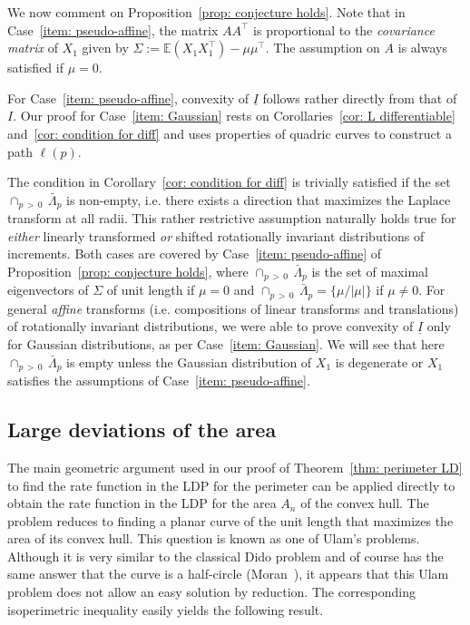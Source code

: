 \documentclass[AHL,Unicode,published]{cedram}
\newcommand{\ubar}[1]{\underline{#1}}
\newcommand{\E}{\mathbb{E}}
\begin{document}
We now comment on Proposition~\ref{prop: conjecture holds}. Note that in Case~\eqref{item: pseudo-affine}, the matrix $A A^\top$ is proportional to the \emph{covariance matrix} of $X_1$ given by $\Sigma:=\E (X_1 X_1^\top) - \mu \mu^\top$. The assumption on $A$ is always satisfied if $\mu=0$.

For Case~\eqref{item: pseudo-affine}, convexity of $\ubar I$ follows rather directly from that of $I$. Our proof for Case~\eqref{item: Gaussian} rests on Corollaries~\ref{cor: L differentiable} and~\ref{cor: condition for diff} and uses properties of quadric curves to construct a path $\ell(p)$.

The condition in Corollary~\ref{cor: condition for diff} is trivially satisfied if the set $\cap_{p\,>\,0}\,\bar{\Lambda}_p$ is non-empty, i.e. there exists a direction that maximizes the Laplace transform at all radii. This rather restrictive assumption naturally holds true for \emph{either} linearly transformed \emph{or} shifted rotationally invariant distributions of increments. Both cases are covered by Case~\eqref{item: pseudo-affine} of Proposition~\ref{prop: conjecture holds}, where $\cap_{p\,>\,0}\,\bar{\Lambda}_p$ is the set of maximal eigenvectors of $\Sigma$ of unit length if $\mu=0$ and $\cap_{p\,>\,0}\,\bar{\Lambda}_p = \{\mu /|\mu|\}$ if $\mu \neq 0$. For general \emph{affine} transforms (i.e. compositions of linear transforms and translations) of rotationally invariant distributions, we were able to prove convexity of $\ubar I$ only for Gaussian distributions, as per Case~\eqref{item: Gaussian}. We will see that here $\cap_{p\,>\,0}\,\bar{\Lambda}_p $ is empty unless the Gaussian distribution of $X_1$ is degenerate or $X_1$ satisfies the assumptions of Case~\eqref{item: pseudo-affine}.



\subsection{Large deviations of the area}\label{sec: results area}

The main geometric argument used in our proof of Theorem~\ref{thm: perimeter LD} to find the rate function in the LDP for the perimeter can be applied directly to obtain the rate function in the LDP for the area $A_n$ of the convex hull. The problem reduces to finding a planar curve of the unit length that maximizes the area of its convex hull. This question is known as one of Ulam's problems. Although it is very similar to the classical Dido problem and of course has the same answer that the curve is a half-circle (Moran~\cite{Moran}), it appears that this Ulam problem does not allow an easy solution by reduction. The corresponding isoperimetric inequality easily yields the following result.
\end{document}
